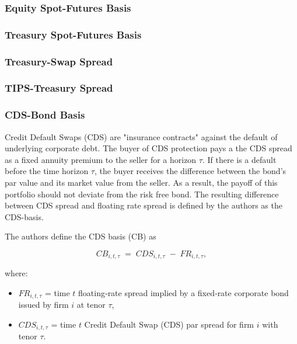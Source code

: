 \documentclass{article}
\begin{document}
\begin{appendices}
\subsubsection{Equity Spot-Futures Basis}

\subsubsection{Treasury Spot-Futures Basis}

\subsubsection{Treasury-Swap Spread}

\subsubsection{TIPS-Treasury Spread}

\subsubsection{CDS-Bond Basis}

Credit Default Swaps (CDS) are "insurance contracts" against the default of underlying
corporate debt. The buyer of CDS protection pays a the CDS spread as a 
fixed annuity premium to the seller for a horizon $\tau$. If there is a default
before the time horizon $\tau$, the buyer receives the difference between
the bond's par value and its market value from the seller. 
As a result, the payoff of this portfolio should not deviate from the risk free bond. The resulting difference
between CDS spread and floating rate spread is defined by the authors as the CDS-basis.

The authors define the CDS basis (CB) as

\begin{equation}
  CB_{i,t,\tau} \;=\; CDS_{i,t,\tau} \;-\; FR_{i,t,\tau},
\end{equation}

where:
\begin{itemize}
  \item $FR_{i,t,\tau}$ = time $t$ floating‐rate spread implied by a fixed‐rate corporate bond issued by firm $i$ at tenor $\tau$,
  \item $CDS_{i,t,\tau}$ = time $t$ Credit Default Swap (CDS) par spread for firm $i$ with tenor $\tau$.
\end{itemize}


\end{appendices}
\end{document}
